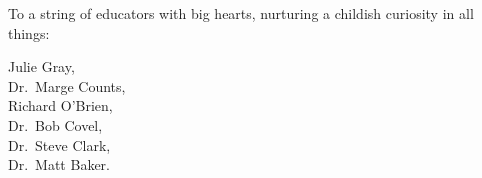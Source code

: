 
To a string of educators with big hearts, nurturing a childish curiosity in all things:

{\centering
Julie Gray,\\
Dr.\ Marge Counts,\\
Richard O'Brien,\\
Dr.\ Bob Covel,\\
Dr.\ Steve Clark,\\
Dr.\ Matt Baker.\\}
